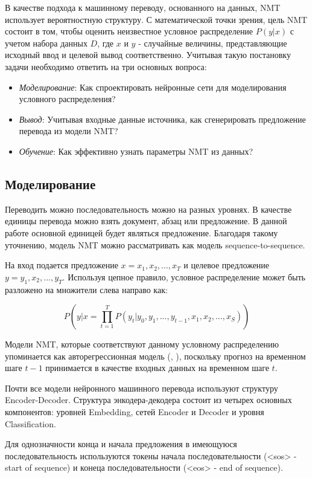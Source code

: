 	В качестве подхода к машинному переводу, основанного на данных, NMT использует вероятностную структуру. С математической точки зрения, цель NMT состоит в том, чтобы оценить неизвестное условное распределение $P(y|x)$ с учетом набора данных $D$, где $x$ и $y$ - случайные величины, представляющие исходный ввод и целевой вывод соответственно. Учитывая такую постановку задачи необходимо ответить на три основных вопроса:
	
	\begin{itemize}
		\item \textit{Моделирование}: Как спроектировать нейронные сети для моделирования условного распределения? 
		\item \textit{Вывод}: Учитывая входные данные источника, как сгенерировать предложение перевода из модели NMT?
		\item \textit{Обучение}: Как эффективно узнать параметры NMT из данных?
	\end{itemize}
    
    \subsection{Моделирование}
    
    Переводить можно последовательность можно на разных уровнях. В качестве единицы перевода можно взять документ, абзац или предложение. В данной работе основной единицей будет являться предложение. Благодаря такому уточнению, модель NMT можно рассматривать как модель sequence-to-sequence. 
    
    На вход подается предложение $x = {x_1, x_2, ... , x_T}$ и целевое предложение $y = {y_1, x_2, ... , y_T}$. Используя цепное правило, условное распределение может быть разложено на множители слева направо как:
    
    $$
        P(y|x = \prod\limits_{t = 1}^{T} P(y_t | y_0, y_1, ..., y_{t-1}, x_1, x_2, ..., x_S))
    $$
    
    Модели NMT, которые соответствуют данному условному распределению упоминается как авторегрессионная модель (\cite{3}, \cite{5}), поскольку прогноз на временном шаге $t - 1$ принимается в качестве входных данных на временном шаге $t$.
    
    Почти все модели нейронного машинного перевода используют структуру Encoder-Decoder. Структура энкодера-декодера состоит из четырех основных компонентов: уровней Embedding, сетей Encoder и Decoder и уровня Classification.
    
    Для однозначности конца и начала предложения в имеющуюся последовательность используются токены начала последовательности (<sos> - start of sequence) и конеца последовательности (<eos> - end of sequence). 
    
